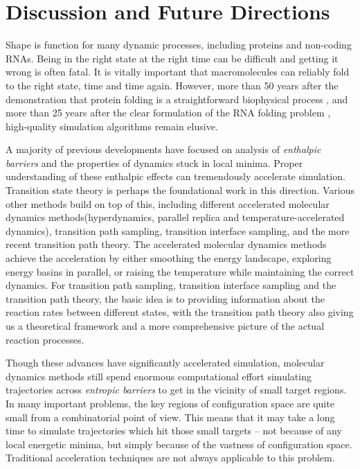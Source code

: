\documentclass[english, aip, jcp, priprint, graphicx,floatfix]{revtex4-1}
\theoremstyle{plain}
\theoremstyle{definition}
\theoremstyle{plain}
\begin{document}
\section{Discussion and Future Directions}\label{sec:conclusion}

Shape is function for many dynamic processes, including proteins and non-coding RNAs. Being in the right state at the right time can be difficult\cite{Levinthal1968-ov} and getting it wrong is often fatal.\cite{Luheshi2008-wd} It is vitally important that macromolecules can reliably fold to the right state, time and time again. However, more than 50 years after the demonstration that protein folding is a straightforward biophysical process \cite{Anfinsen1961-xe}, and more than 25 years after the clear formulation of the RNA folding problem \cite{Draper1992-pm}, high-quality simulation algorithms remain elusive.   

A majority of previous developments have focused on analysis of \emph{enthalpic barriers} and the properties of dynamics stuck in local minima.\cite{Christen2008-ge}  Proper understanding of these enthalpic effects can tremendously accelerate simulation.  Transition state theory\cite{Eyring1935-ur, Chandler1978-bq, Wigner1997-kk} is perhaps the foundational work in this direction. Various other methods build on top of this, including different accelerated molecular dynamics methods\cite{Perez2009-jy}(hyperdynamics\cite{Voter1997-gi}, parallel replica\cite{Voter1998-mv} and temperature-accelerated dynamics\cite{Sorensen2000-qm}), transition path sampling,\cite{Dellago1998-lb, Bolhuis2002-ws} transition interface sampling,\cite{Van_Erp2005-vw} and the more recent transition path theory.\cite{E2006-fm, E2010-sr} The accelerated molecular dynamics methods achieve the acceleration by either smoothing the energy landscape, exploring energy basins in parallel, or raising the temperature while maintaining the correct dynamics. For transition path sampling, transition interface sampling and the transition path theory, the basic idea is to providing information about the reaction rates between different states, with the transition path theory also giving us a theoretical framework and a more comprehensive picture of the actual reaction processes.

Though these advances have significantly accelerated simulation, molecular dynamics methods still spend enormous computational effort simulating trajectories across \emph{entropic barriers} to get in the vicinity of small target regions.  In many important problems, the key regions of configuration space are quite small from a combinatorial point of view.\cite{McLeish2005-dq}  This means that it may take a long time to simulate trajectories which hit those small targets -- not because of any local energetic minima, but simply because of the vastness of configuration space.  Traditional acceleration techniques are not always applicable to this problem.\cite{Baum1986-we, Wille1987-tf, Machta2009-gh} 
\end{document}
